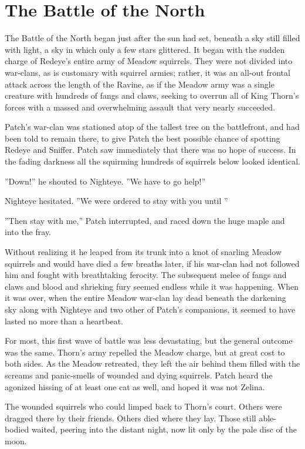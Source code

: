 \documentclass[12pt]{book}
\begin{document}
\section{The Battle of the North}

 The Battle of the North began just after the sun had set, beneath a sky still filled with light, a sky in which only a few stars glittered. It began with the sudden charge of Redeye's entire army of Meadow squirrels. They were not divided into war-clans, as is customary with squirrel armies; rather, it was an all-out frontal attack across the length of the Ravine, as if the Meadow army was a single creature with hundreds of fangs and claws, seeking to overrun all of King Thorn's forces with a massed and overwhelming assault that very nearly succeeded.\par
 Patch's war-clan was stationed atop of the tallest tree on the battlefront, and had been told to remain there, to give Patch the best possible chance of spotting Redeye and Sniffer. Patch saw immediately that there was no hope of success. In the fading darkness all the squirming hundreds of squirrels below looked identical.\par
 ''Down!'' he shouted to Nighteye. ''We have to go help!''\par
 Nighteye hesitated. ''We were ordered to stay with you until %
''\par
 ''Then stay with me,'' Patch interrupted, and raced down the huge maple and into the fray.\par
Without realizing it he leaped from its trunk into a knot of snarling Meadow squirrels %
 and would have died a few breaths later, if his war-clan had not followed him and fought with breathtaking ferocity. The subsequent melee of fangs and claws and blood and shrieking fury seemed endless while it was happening. When it was over, when the entire Meadow war-clan lay dead beneath the darkening sky along with Nighteye and two other of Patch's companions, it seemed to have lasted no more than a heartbeat.\par
 For most, this first wave of battle was less devastating, but the general outcome was the same. Thorn's army repelled the Meadow charge, but at great cost to both sides. As the Meadow retreated, they left the air behind them filled with the screams and panic-smells of wounded and dying squirrels. Patch heard the agonized hissing of at least one cat as well, and hoped it was not Zelina.\par
 The wounded squirrels who could limped back to Thorn's court. Others were dragged there by their friends. Others died where they lay. Those still able-bodied waited, peering into the distant night, now lit only by the pale disc of the moon.\par
\end{document}
